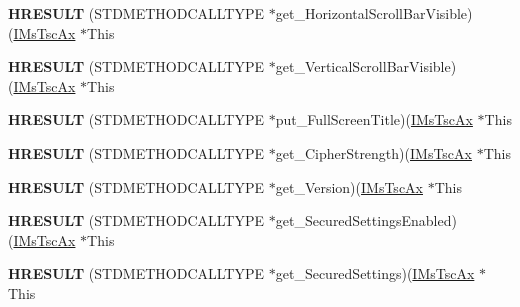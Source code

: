 \begin{DoxyCompactItemize}
{\bfseries H\+R\+E\+S\+U\+LT} (S\+T\+D\+M\+E\+T\+H\+O\+D\+C\+A\+L\+L\+T\+Y\+PE $\ast$get\+\_\+\+Horizontal\+Scroll\+Bar\+Visible)(\hyperlink{interface_m_s_t_s_c_lib_1_1_i_ms_tsc_ax}{I\+Ms\+Tsc\+Ax} $\ast$This
\item 
\mbox{\label{struct_m_s_t_s_c_lib_1_1_i_ms_tsc_ax_vtbl_a2d854fa041e33a70997cc9fcc268504e}} 
{\bfseries H\+R\+E\+S\+U\+LT} (S\+T\+D\+M\+E\+T\+H\+O\+D\+C\+A\+L\+L\+T\+Y\+PE $\ast$get\+\_\+\+Vertical\+Scroll\+Bar\+Visible)(\hyperlink{interface_m_s_t_s_c_lib_1_1_i_ms_tsc_ax}{I\+Ms\+Tsc\+Ax} $\ast$This
\item 
\mbox{\label{struct_m_s_t_s_c_lib_1_1_i_ms_tsc_ax_vtbl_af2bb6fefe3fdcaf19148441b228562d0}} 
{\bfseries H\+R\+E\+S\+U\+LT} (S\+T\+D\+M\+E\+T\+H\+O\+D\+C\+A\+L\+L\+T\+Y\+PE $\ast$put\+\_\+\+Full\+Screen\+Title)(\hyperlink{interface_m_s_t_s_c_lib_1_1_i_ms_tsc_ax}{I\+Ms\+Tsc\+Ax} $\ast$This
\item 
\mbox{\label{struct_m_s_t_s_c_lib_1_1_i_ms_tsc_ax_vtbl_a7a91593afd9671a061039089791f28ec}} 
{\bfseries H\+R\+E\+S\+U\+LT} (S\+T\+D\+M\+E\+T\+H\+O\+D\+C\+A\+L\+L\+T\+Y\+PE $\ast$get\+\_\+\+Cipher\+Strength)(\hyperlink{interface_m_s_t_s_c_lib_1_1_i_ms_tsc_ax}{I\+Ms\+Tsc\+Ax} $\ast$This
\item 
\mbox{\label{struct_m_s_t_s_c_lib_1_1_i_ms_tsc_ax_vtbl_a68fbf5deafcfa8db54c705e4c8a553a3}} 
{\bfseries H\+R\+E\+S\+U\+LT} (S\+T\+D\+M\+E\+T\+H\+O\+D\+C\+A\+L\+L\+T\+Y\+PE $\ast$get\+\_\+\+Version)(\hyperlink{interface_m_s_t_s_c_lib_1_1_i_ms_tsc_ax}{I\+Ms\+Tsc\+Ax} $\ast$This
\item 
\mbox{\label{struct_m_s_t_s_c_lib_1_1_i_ms_tsc_ax_vtbl_a10273a1f07cc27b66687bfd4f23894b0}} 
{\bfseries H\+R\+E\+S\+U\+LT} (S\+T\+D\+M\+E\+T\+H\+O\+D\+C\+A\+L\+L\+T\+Y\+PE $\ast$get\+\_\+\+Secured\+Settings\+Enabled)(\hyperlink{interface_m_s_t_s_c_lib_1_1_i_ms_tsc_ax}{I\+Ms\+Tsc\+Ax} $\ast$This
\item 
\mbox{\label{struct_m_s_t_s_c_lib_1_1_i_ms_tsc_ax_vtbl_ad254bbc601f6c9a48636c3ed60eef09f}} 
{\bfseries H\+R\+E\+S\+U\+LT} (S\+T\+D\+M\+E\+T\+H\+O\+D\+C\+A\+L\+L\+T\+Y\+PE $\ast$get\+\_\+\+Secured\+Settings)(\hyperlink{interface_m_s_t_s_c_lib_1_1_i_ms_tsc_ax}{I\+Ms\+Tsc\+Ax} $\ast$This

\end{DoxyCompactItemize}
